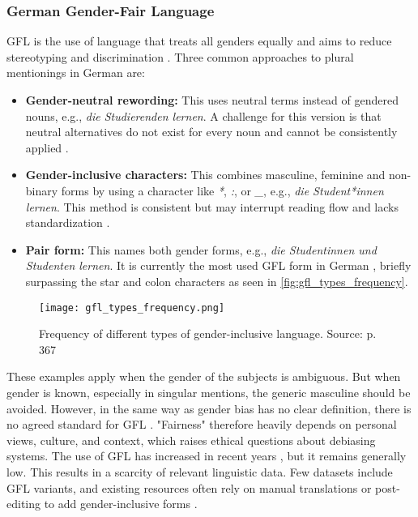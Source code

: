     \subsubsection{German Gender-Fair Language} \label{subsection:german_gfl}
    GFL is the use of language that treats all genders equally and aims to reduce stereotyping and discrimination \parencite{sczesnyCanGenderFairLanguage2016}. Three common approaches to plural mentionings in German are: 

    \begin{itemize}
        \item \textbf{Gender-neutral rewording:}  
        This uses neutral terms instead of gendered nouns, e.g., \textit{die Studierenden lernen}. A challenge for this version is that neutral alternatives do not exist for every noun and cannot be consistently applied \parencite{lardelliBuildingBridgesDataset2024}.

        \item \textbf{Gender-inclusive characters:}  
        This combines masculine, feminine and non-binary forms by using a character like \textit{*}, \textit{:}, or \textit{\_}, e.g., \textit{die Student*innen lernen}. This method is consistent but may interrupt reading flow and lacks standardization \parencite{lardelliBuildingBridgesDataset2024}.

        \item \textbf{Pair form:}  
        This names both gender forms, e.g., \textit{die Studentinnen und Studenten lernen}. It is currently the most used GFL form in German \parencite{waldendorfWordsChangeIncrease2024}, briefly surpassing the star and colon characters as seen in \autoref{fig:gfl_types_frequency}.
    \end{itemize}

    \vspace{0.8em}
    \begin{figure}[htb]
        \centering
            \texttt{[image: gfl\_types\_frequency.png]}
        \caption[Frequency of different types of gender-inclusive language]{Frequency of different types of gender-inclusive language. Source: \textcite{waldendorfWordsChangeIncrease2024} p. 367}
        \label{fig:gfl_types_frequency}
    \end{figure}

    These examples apply when the gender of the subjects is ambiguous. But when gender is known, especially in singular mentions, the generic masculine should be avoided. However, in the same way as gender bias has no clear definition, there is no agreed standard for GFL \parencite{lardelliBuildingBridgesDataset2024, savoldiDecadeGenderBias2025}. "Fairness" therefore heavily depends on personal views, culture, and context, which raises ethical questions about debiasing systems. 
    The use of GFL has increased in recent years \parencite{waldendorfWordsChangeIncrease2024}, but it remains generally low. This results in a scarcity of relevant linguistic data. Few datasets include GFL variants, and existing resources often rely on manual translations or post-editing to add gender-inclusive forms \parencite{lardelliBuildingBridgesDataset2024}. 

